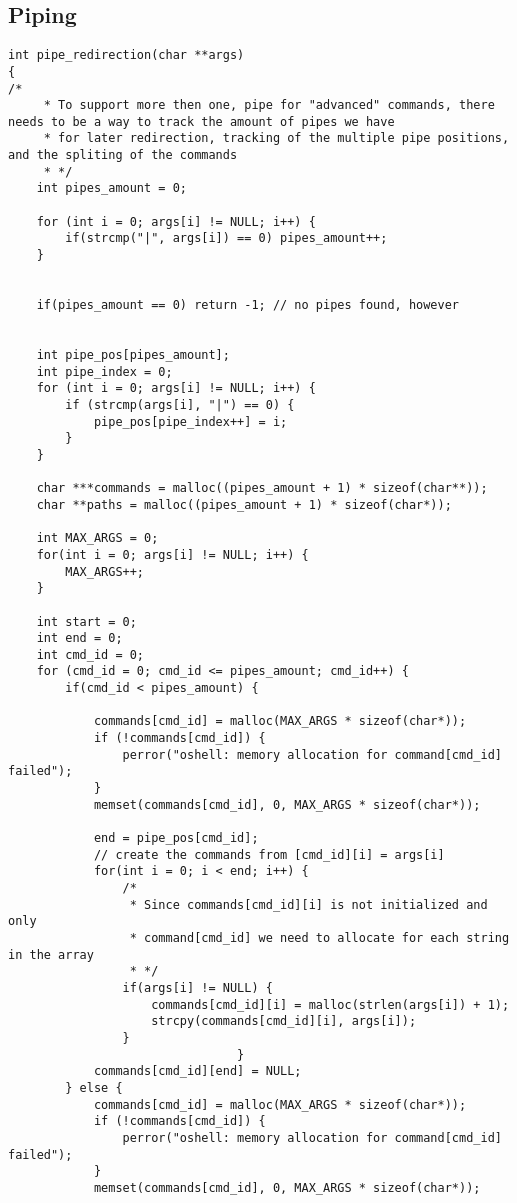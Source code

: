 \documentclass[12pt,english]{article}
\newcommand{\usubsection}[1]{\subsection*{#1}
\addcontentsline{toc}{subsection}{\protect\numberline{}#1}}
\begin{document}
\newpage
\usubsection{Piping}
\begin{verbatim}
int pipe_redirection(char **args) 
{
/*
     * To support more then one, pipe for "advanced" commands, there needs to be a way to track the amount of pipes we have
     * for later redirection, tracking of the multiple pipe positions, and the spliting of the commands
     * */
    int pipes_amount = 0;

    for (int i = 0; args[i] != NULL; i++) {
        if(strcmp("|", args[i]) == 0) pipes_amount++;
    }


    if(pipes_amount == 0) return -1; // no pipes found, however

    
    int pipe_pos[pipes_amount];
    int pipe_index = 0;
    for (int i = 0; args[i] != NULL; i++) {
        if (strcmp(args[i], "|") == 0) {
            pipe_pos[pipe_index++] = i;
        }
    }

    char ***commands = malloc((pipes_amount + 1) * sizeof(char**));
    char **paths = malloc((pipes_amount + 1) * sizeof(char*));

    int MAX_ARGS = 0;
    for(int i = 0; args[i] != NULL; i++) {
        MAX_ARGS++;
    }

    int start = 0;
    int end = 0;
    int cmd_id = 0;
    for (cmd_id = 0; cmd_id <= pipes_amount; cmd_id++) {
        if(cmd_id < pipes_amount) {

            commands[cmd_id] = malloc(MAX_ARGS * sizeof(char*));
            if (!commands[cmd_id]) {
                perror("oshell: memory allocation for command[cmd_id] failed");
            }
            memset(commands[cmd_id], 0, MAX_ARGS * sizeof(char*));

            end = pipe_pos[cmd_id];
            // create the commands from [cmd_id][i] = args[i]
            for(int i = 0; i < end; i++) {
                /*
                 * Since commands[cmd_id][i] is not initialized and only
                 * command[cmd_id] we need to allocate for each string in the array
                 * */
                if(args[i] != NULL) {
                    commands[cmd_id][i] = malloc(strlen(args[i]) + 1);
                    strcpy(commands[cmd_id][i], args[i]);
                }
                                }
            commands[cmd_id][end] = NULL;
        } else {
            commands[cmd_id] = malloc(MAX_ARGS * sizeof(char*));
            if (!commands[cmd_id]) {
                perror("oshell: memory allocation for command[cmd_id] failed");
            }
            memset(commands[cmd_id], 0, MAX_ARGS * sizeof(char*));


\end{verbatim}
\end{document}
